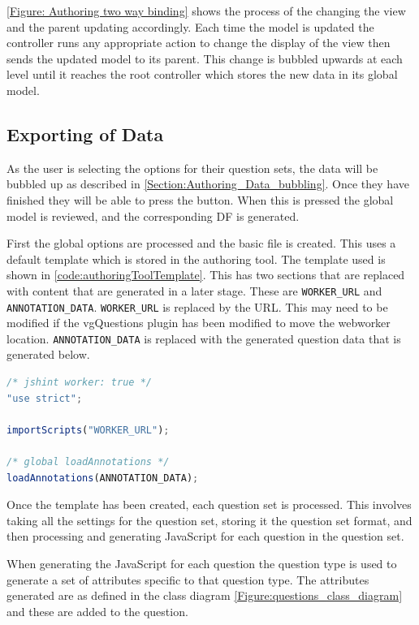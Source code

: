 \autoref{Figure: Authoring two way binding} shows the process of the changing the view and the parent updating accordingly. Each time the model is updated the controller runs any appropriate action to change the display of the view then sends the updated model to its parent. This change is bubbled upwards at each level until it reaches the root controller which stores the new data in its global model.

\subsection{Exporting of Data}
\label{Section:Authoring_export_data}

As the user is selecting the options for their question sets, the data will be bubbled up as described in \autoref{Section:Authoring_Data_bubbling}. Once they have finished they will be able to press the  button. When this is pressed the global model is reviewed, and the corresponding \gls{DF} is generated.

First the global options are processed and the basic file is created. This uses a default template which is stored in the authoring tool. The template used is shown in \autoref{code:authoringToolTemplate}. This has two sections that are replaced with content that are generated in a later stage. These are \lstinline|WORKER_URL| and \lstinline|ANNOTATION_DATA|. \lstinline|WORKER_URL| is replaced by the URL. This may need to be modified if the \gls{vgQuestions} plugin has been modified to move the \gls{webworker} location. \lstinline|ANNOTATION_DATA| is replaced with the generated question data that is generated below.

\begin{lstlisting}[language=javascript,caption={Base template for authoring tool \gls{DF} generation},label={code:authoringToolTemplate} ]
/* jshint worker: true */
"use strict";

importScripts("WORKER_URL");

/* global loadAnnotations */
loadAnnotations(ANNOTATION_DATA);
\end{lstlisting}

Once the template has been created, each question set is processed. This involves taking all the settings for the question set, storing it the question set format, and then processing and generating JavaScript for each question in the question set.

When generating the JavaScript for each question the question type is used to generate a set of attributes specific to that question type. The attributes generated are as defined in the class diagram \autoref{Figure:questions_class_diagram} and these are added to the question.

